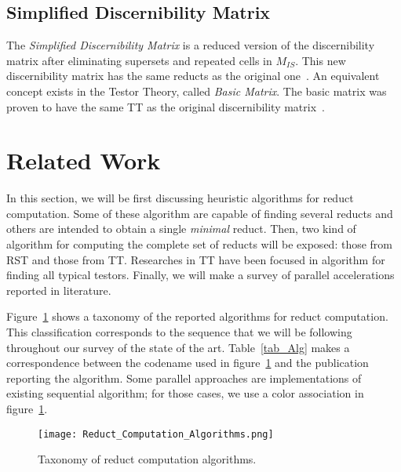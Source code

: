 \documentclass[authoryear,11pt]{elsarticle}
\begin{document}
\subsection{Simplified Discernibility Matrix}
  The \textit{Simplified Discernibility Matrix} is a reduced version of the discernibility matrix after
  eliminating supersets and repeated cells in $M_{IS}$. This new discernibility matrix has the same reducts
  as the original one~\citep{Yao09}. An equivalent concept exists in the Testor Theory, called 
  \textit{Basic Matrix}. The basic matrix was proven to have the same TT as the original discernibility 
  matrix~\citep{Lazo01}.

\section{Related Work}\label{relatedWork}
  In this section, we will be first discussing heuristic algorithms for reduct computation. Some of these 
  algorithm are capable of finding several reducts and others are intended to obtain a single \textit{minimal} 
  reduct. Then, two kind of algorithm for computing the complete set of reducts will be exposed: those 
  from RST and those from TT. Researches in TT have been focused in algorithm for finding all typical testors.
  Finally, we will make a survey of parallel accelerations reported in literature.  
  
  Figure~\ref{fig_Tax} shows a taxonomy of the reported algorithms for reduct computation. This classification
  corresponds to the sequence that we will be following throughout our survey of the state of the art. 
  Table~\ref{tab_Alg} makes a correspondence between the codename used in figure~\ref{fig_Tax} and the 
  publication reporting the algorithm. Some parallel approaches are implementations of existing sequential 
  algorithm; for those cases, we use a color association in figure~\ref{fig_Tax}.

  \begin{figure}[htb] 
    \centering
    \texttt{[image: Reduct\_Computation\_Algorithms.png]}
	\caption{Taxonomy of reduct computation algorithms.}
	\label{fig_Tax}
 \end{figure}
 
\end{document}

